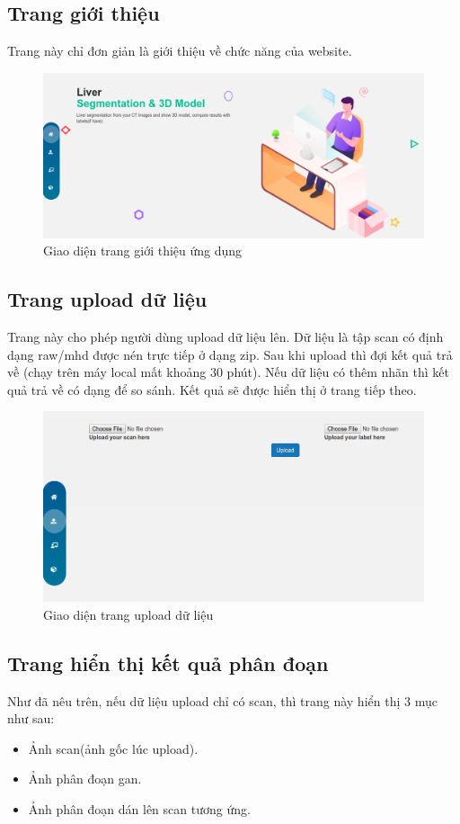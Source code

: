 \subsection{Trang giới thiệu}
Trang này chỉ đơn giản là giới thiệu về chức năng của website.
\begin{figure}[h]
\centering
    \includegraphics[totalheight=7cm]{Images/app_intro.png}
    \caption{Giao diện trang giới thiệu ứng dụng}
    \label{skip_conn}
\end{figure}
\subsection{Trang upload dữ liệu}
Trang này cho phép người dùng upload dữ liệu lên. Dữ liệu là tập scan có định dạng raw/mhd được nén trực tiếp ở dạng zip. Sau khi upload thì đợi kết quả trả về (chạy trên máy local mất khoảng 30 phút). Nếu dữ liệu có thêm nhãn thì kết quả trả về có dạng để so sánh. Kết quả sẽ được hiển thị ở trang tiếp theo.
\begin{figure}[h]
\centering
    \includegraphics[totalheight=7cm]{Images/app_upload.png}
    \caption{Giao diện trang upload dữ liệu}
    \label{skip_conn}
\end{figure}
\subsection{Trang hiển thị kết quả phân đoạn}
Như đã nêu trên, nếu dữ liệu upload chỉ có scan, thì trang này hiển thị 3 mục như sau:
\begin{itemize}
    \item Ảnh scan(ảnh gốc lúc upload).
    \item Ảnh phân đoạn gan.
    \item Ảnh phân đoạn dán lên scan tương ứng.
\end{itemize}

